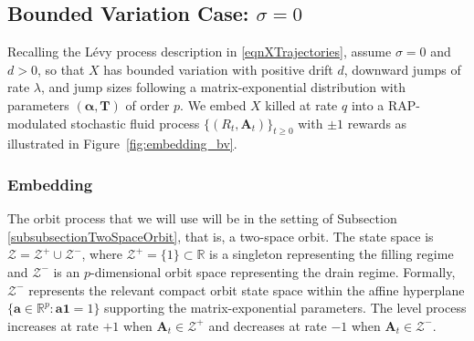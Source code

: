 \documentclass[a4paper,11pt]{article}
\newcommand{\correction}[1]{{\textcolor{blue}{#1}}}
\numberwithin{equation}{section}
\theoremstyle{plain}
\theoremstyle{definition}
\newcommand{\1}{\mathbf{1}}
\begin{document}


\subsection{Bounded Variation Case: $\sigma = 0$}

Recalling the L\'evy process description in \eqref{eqnXTrajectories}, assume $\sigma = 0$ and $d > 0$, so that $X$ has bounded variation with positive drift $d$, downward jumps of rate $\lambda$, and jump sizes following a matrix-exponential distribution with parameters $(\bm{\alpha}, \bm{T})$ of order $p$. We embed $X$ killed at rate $q$ into a RAP-modulated stochastic fluid process $\{(R_t, \bm{A}_t)\}_{t \ge 0}$ with $\pm 1$ rewards as illustrated in Figure~\ref{fig:embedding_bv}.

\subsubsection{Embedding}


The orbit process that we will use will be in the setting of Subsection \ref{subsubsectionTwoSpaceOrbit}, that is, a two-space orbit. 
The state space is $\mathcal{Z} = \mathcal{Z}^+ \cup \mathcal{Z}^-$, where $\mathcal{Z}^+ = \{1\} \subset \mathbb{R}$ is a singleton representing the filling regime and $\mathcal{Z}^-$ is an $p$-dimensional orbit space representing the drain regime. 
Formally, $\mathcal{Z}^-$ represents the relevant compact orbit state space within the affine hyperplane $\{\bm{a}\in\mathbb{R}^p:\bm{a}\bm{1}=1\}$ supporting the matrix-exponential parameters. The level process increases at rate $+1$ when $\bm{A}_t \in \mathcal{Z}^+$ and decreases at rate $-1$ when $\bm{A}_t \in \mathcal{Z}^-$.
\end{document}

